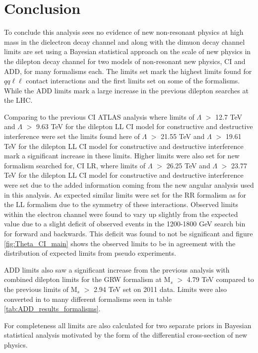 \chapter{Conclusion}

To conclude this analysis sees no evidence of new non-resonant physics at high mass in the dielectron decay channel and along with the dimuon decay channel limits are set using a Bayesian statistical approach on the scale of new physics in the dilepton decay channel for two models of non-resonant new physics, CI and ADD, for many formalisms each. The limits set mark the highest limits found for $qq\ell\ell$ contact interactions and the first limits set on some of the formalisms. While the ADD limits mark a large increase in the previous dilepton searches at the LHC.

Comparing to the previous CI ATLAS analysis \cite{PhysRevD.87.015010} where limits of $\Lambda$ $>$ 12.7 TeV and $\Lambda$ $>$ 9.63 TeV for the dilepton LL CI model for constructive and destructive interference were set the limits found here of $\Lambda$ $>$ 21.55 TeV and $\Lambda$ $>$ 19.61 TeV for the dilepton LL CI model for constructive and destructive interference mark a significant increase in these limits. Higher limits were also set for new formalism searched for, CI LR, where limits of $\Lambda$ $>$ 26.25 TeV and $\Lambda$ $>$ 23.77 TeV for the dilepton LL CI model for constructive and destructive interference were set due to the added information coming from the new angular analysis used in this analysis. As expected similar limits were set for the RR formalism as for the LL formalism due to the symmetry of these interactions. Observed limits within the electron channel were found to vary up slightly from the expected value due to a slight deficit of observed events in the 1200-1800 GeV search bin for forward and backwards. This deficit was found to not be significant and figure \ref{fig:Theta_CI_main} shows the observed limits to be in agreement with the distribution of expected limits from pseudo experiments.

ADD limits also saw a significant increase from the previous analysis \cite{PhysRevD.87.015010} with combined dilepton limits for the GRW formalism at M$_{s}$ $>$ 4.79 TeV compared to the previous limits of M$_{s}$ $>$ 2.94 TeV set on 2011 data. Limits were also converted in to many different formalisms seen in table \ref{tab:ADD_results_formalisms}. 

For completeness all limits are also calculated for two separate priors in Bayesian statistical analysis motivated by the form of the differential cross-section of new physics.


